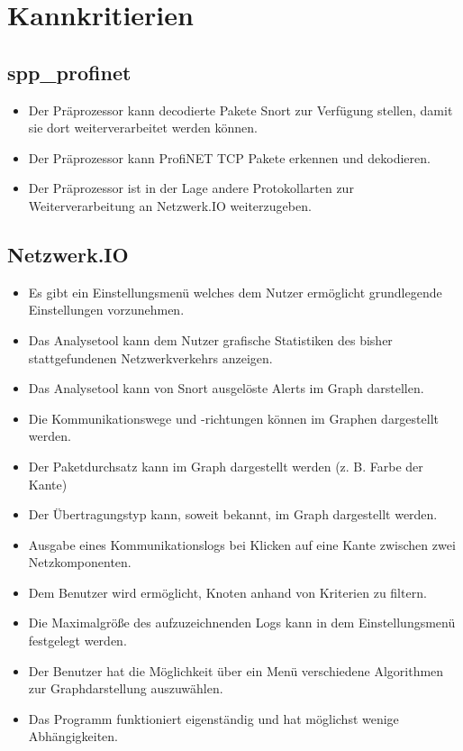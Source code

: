 \section{Kannkritierien}

\subsection{spp\_profinet}

\begin{itemize}

\item Der Präprozessor kann decodierte Pakete Snort zur Verfügung stellen, damit sie dort weiterverarbeitet werden können. 

\item Der Präprozessor kann ProfiNET TCP Pakete erkennen und dekodieren.

\item Der Präprozessor ist in der Lage andere Protokollarten zur Weiterverarbeitung an Netzwerk.IO weiterzugeben.
\end{itemize}

\subsection{Netzwerk.IO}

\begin{itemize}
\item Es gibt ein Einstellungsmenü welches dem Nutzer ermöglicht grundlegende Einstellungen vorzunehmen.

\item Das Analysetool kann dem Nutzer grafische Statistiken des bisher stattgefundenen Netzwerkverkehrs anzeigen.

\item Das Analysetool kann von Snort ausgelöste Alerts im Graph darstellen.

\item Die Kommunikationswege und -richtungen können im Graphen dargestellt werden.

\item Der Paketdurchsatz kann im Graph dargestellt werden (z. B. Farbe der Kante)

\item Der Übertragungstyp kann, soweit bekannt, im Graph dargestellt werden. 

\item Ausgabe eines Kommunikationslogs bei Klicken auf eine Kante zwischen zwei Netzkomponenten.

\item Dem Benutzer wird ermöglicht, Knoten anhand von Kriterien zu filtern.

\item Die Maximalgröße des aufzuzeichnenden Logs kann in dem Einstellungsmenü festgelegt werden.

\item Der Benutzer hat die Möglichkeit über ein Menü verschiedene Algorithmen zur Graphdarstellung auszuwählen.

\item Das Programm funktioniert eigenständig und hat möglichst wenige Abhängigkeiten.
\end{itemize}

